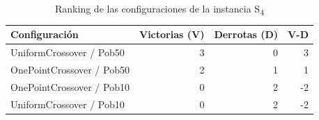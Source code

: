 \begin{table}[h]
\centering
\caption{Ranking de las configuraciones de la instancia S\textsubscript{4}}
\label{tab:rankingS4}
\begin{tabular}{lrrr}
\hline
\multicolumn{1}{l}{\textbf{Configuración}} & \textbf{Victorias (V)} & \textbf{Derrotas (D)} & \textbf{V-D} \\ \hline
UniformCrossover / Pob50                   & 3                      & 0                     & 3            \\ \hline
OnePointCrossover / Pob50                  & 2                      & 1                     & 1            \\ \hline
OnePointCrossover / Pob10                  & 0                      & 2                     & -2           \\ \hline
UniformCrossover / Pob10                   & 0                      & 2                     & -2           \\ \hline
\end{tabular}
\end{table}

